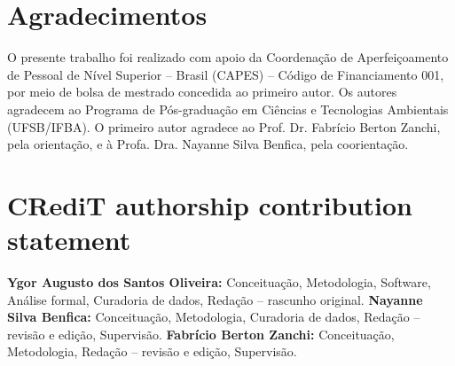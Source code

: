 \documentclass[a4paper,fleqn]{cas-sc}
\begin{document}
\section*{Agradecimentos}
O presente trabalho foi realizado com apoio da Coordenação de Aperfeiçoamento de Pessoal de Nível Superior -- Brasil (CAPES) -- Código de Financiamento 001, por meio de bolsa de mestrado concedida ao primeiro autor. Os autores agradecem ao Programa de Pós-graduação em Ciências e Tecnologias Ambientais (UFSB/IFBA). O primeiro autor agradece ao Prof. Dr. Fabrício Berton Zanchi, pela orientação, e à Profa. Dra. Nayanne Silva Benfica, pela coorientação.

\section*{CRediT authorship contribution statement}
\textbf{Ygor Augusto dos Santos Oliveira:} Conceituação, Metodologia, Software, Análise formal, Curadoria de dados, Redação -- rascunho original. \textbf{Nayanne Silva Benfica:} Conceituação, Metodologia, Curadoria de dados, Redação -- revisão e edição, Supervisão. \textbf{Fabrício Berton Zanchi:} Conceituação, Metodologia, Redação -- revisão e edição, Supervisão.



\end{document}
